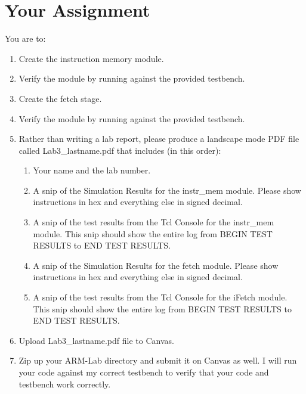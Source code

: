 \section{Your Assignment}
You are to:
\begin{enumerate}
\item Create the instruction memory module.
\item Verify the module by running against the provided testbench.
\item Create the fetch stage.
\item Verify the module by running against the provided testbench.
\item Rather than writing a lab report, please produce a landscape mode PDF file called Lab3\_lastname.pdf that includes (in this order):
\begin{enumerate}
\item Your name and the lab number.
\item A snip of the Simulation Results for the instr\_mem module.  Please show instructions in hex and everything else in signed decimal.  
\item A snip of the test results from the Tcl Console for the instr\_mem module.  This snip should show the entire log from BEGIN TEST RESULTS to END TEST RESULTS.
\item A snip of the Simulation Results for the fetch module.  Please show instructions in hex and everything else in signed decimal.  
\item A snip of the test results from the Tcl Console for the iFetch module.  This snip should show the entire log from BEGIN TEST RESULTS to END TEST RESULTS.	
\end{enumerate}
\item Upload Lab3\_lastname.pdf file to Canvas.
\item Zip up your ARM-Lab directory and submit it on Canvas as well.  I will run your code against my correct testbench to verify that your code and testbench work correctly.
\end{enumerate} 